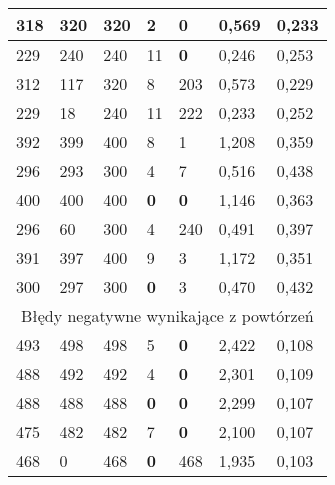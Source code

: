 \documentclass[a4paper]{article}
\begin{document}
\begin{table}[H]
\begin{tabular}{|p{1.6cm}|p{1.6cm}|p{1.6cm}|p{1.6cm}|p{1.6cm}|p{1.6cm}|p{1.6cm}|}
318 & 320 & 320 & 2 & \textbf{0} & 0,569 & 0,233 \\ \hline
229 & 240 & 240 & 11 & \textbf{0} & 0,246 & 0,253 \\ \hline
312 & 117 & 320 & 8 & 203 & 0,573 & 0,229 \\ \hline
229 & 18 & 240 & 11 & 222 & 0,233 & 0,252 \\ \hline
392 & 399 & 400 & 8 & 1 & 1,208 & 0,359 \\ \hline
296 & 293 & 300 & 4 & 7 & 0,516 & 0,438 \\ \hline
400 & 400 & 400 & \textbf{0} & \textbf{0} & 1,146 & 0,363 \\ \hline
296 & 60 & 300 & 4 & 240 & 0,491 & 0,397 \\ \hline
391 & 397 & 400 & 9 & 3 & 1,172 & 0,351 \\ \hline
300 & 297 & 300 & \textbf{0} & 3 & 0,470 & 0,432 \\ \hline
\multicolumn{7}{|c|}{Błędy negatywne wynikające z powtórzeń} \\ \hline
493 & 498 & 498 & 5 & \textbf{0} & 2,422 & 0,108 \\ \hline
488 & 492 & 492 & 4 & \textbf{0} & 2,301 & 0,109 \\ \hline
488 & 488 & 488 & \textbf{0} & \textbf{0} & 2,299 & 0,107 \\ \hline
475 & 482 & 482 & 7 & \textbf{0} & 2,100 & 0,107 \\ \hline
468 & 0 & 468 & \textbf{0} & 468 & 1,935 & 0,103 \\ \hline
\end{tabular}
\label{}
\end{table}
\end{document}
